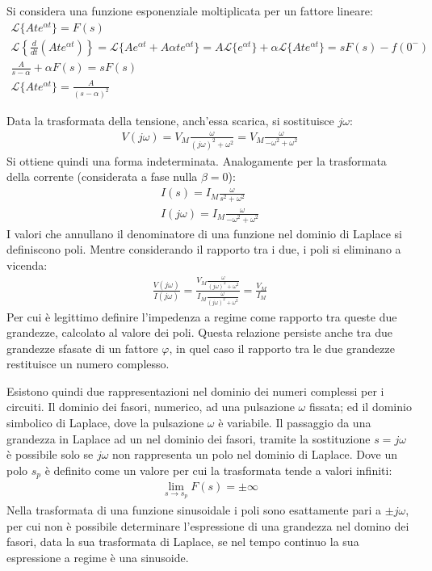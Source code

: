 \documentclass{article}
\numberwithin{equation}{subsection}
\begin{document}
Si considera una funzione esponenziale moltiplicata per un fattore lineare:
\begin{gather*}
    \mathcal{L}\{Ate^{\alpha t}\}=F(s)\\
    \mathcal{L}\left\{\displaystyle\frac{d}{dt}\left(Ate^{\alpha t}\right)\right\}=\mathcal{L}\{Ae^{\alpha t}+A\alpha te^{\alpha t}\}=A\mathcal{L}\{e^{\alpha t}\}+\alpha\mathcal{L}\{Ate^{\alpha t}\}=sF(s)-f(0^-)\\
    \displaystyle\frac{A}{s-\alpha}+\alpha F(s)=sF(s)\\
    \mathcal{L}\{Ate^{\alpha t}\}=\frac{A}{(s-\alpha)^2}
\end{gather*}

Data la trasformata della tensione, anch'essa scarica, si sostituisce $j\omega$:
\begin{gather*}
    V(j\omega)=V_M\displaystyle\frac{\omega}{(j\omega)^2+\omega^2}=V_M\frac{\omega}{-\omega^2+\omega^2}
\end{gather*}
Si ottiene quindi una forma indeterminata. Analogamente per la trasformata della corrente (considerata a fase nulla $\beta=0$): 
\begin{gather*}
    I(s)=\displaystyle I_M\frac{\omega}{s^2+\omega^2}\\
    I(j\omega)=\displaystyle {I_M}\frac{\omega}{-\omega^2+\omega^2}
\end{gather*}
I valori che annullano il denominatore di una funzione nel dominio di Laplace si definiscono poli. Mentre considerando il rapporto tra i due, i poli si eliminano a vicenda:
\begin{gather*}
    \displaystyle\frac{V(j\omega)}{I(j\omega)}=\displaystyle\frac{V_M\displaystyle\frac{\omega}{(j\omega)^2+\omega^2}}{I_M\displaystyle\frac{\omega}{(j\omega)^2+\omega^2}}=\frac{V_M}{I_M}
\end{gather*}
Per cui è legittimo definire l'impedenza a regime come rapporto tra queste due grandezze, calcolato al valore dei poli. Questa relazione persiste anche tra due grandezze 
sfasate di un fattore $\varphi$, in quel caso il rapporto tra le due grandezze restituisce un numero complesso. 


Esistono quindi due rappresentazioni nel dominio dei numeri complessi per i circuiti. Il dominio dei fasori, numerico, ad una pulsazione $\omega$ fissata; ed il dominio 
simbolico di Laplace, dove la pulsazione $\omega$ è variabile. Il passaggio da una grandezza in Laplace ad un nel dominio dei fasori, tramite la sostituzione $s=j\omega$ è 
possibile solo se $j\omega$ non rappresenta un polo nel dominio di Laplace. Dove un polo $s_p$ è definito come un valore per cui la trasformata tende a valori infiniti:
\begin{gather*}
    \lim_{s\to s_p}F(s)=\pm\infty
\end{gather*}
Nella trasformata di una funzione sinusoidale i poli sono esattamente pari a $\pm j\omega$, per cui non è possibile determinare l'espressione di una grandezza nel domino 
dei fasori, data la sua trasformata di Laplace, se nel tempo continuo la sua espressione a regime è una sinusoide. 
\end{document}
